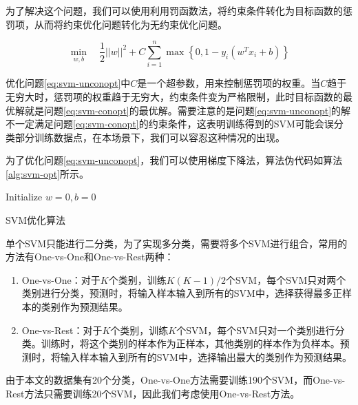 \documentclass{article}
\begin{document}
为了解决这个问题，我们可以使用利用罚函数法，将约束条件转化为目标函数的惩罚项，从而将约束优化问题转化为无约束优化问题。

\begin{equation}
\min_{w,b} \quad \frac{1}{2}||w||^2 + C\sum_{i=1}^n \max\left\{0, 1-y_i(w^Tx_i+b)\right\}
\label{eq:svm-unconopt}
\end{equation}

优化问题\ref{eq:svm-unconopt}中$C$是一个超参数，用来控制惩罚项的权重。当$C$趋于无穷大时，惩罚项的权重趋于无穷大，约束条件变为严格限制，此时目标函数的最优解就是问题\ref{eq:svm-conopt}的最优解。需要注意的是问题\ref{eq:svm-unconopt}的解不一定满足问题\ref{eq:svm-conopt}的约束条件，这表明训练得到的SVM可能会误分类部分训练数据点，在本场景下，我们可以容忍这种情况的出现。

为了优化问题\ref{eq:svm-unconopt}，我们可以使用梯度下降法，算法伪代码如算法\ref{alg:svm-opt}所示。

\begin{algorithm}[]
    \label{alg:svm-opt}
    \DontPrintSemicolon
    \SetAlgoLined
    Initialize $w=0,b=0$\;
    \caption{SVM优化算法}
\end{algorithm}

单个SVM只能进行二分类，为了实现多分类，需要将多个SVM进行组合，常用的方法有One-vs-One和One-vs-Rest两种：

\begin{enumerate}
    \item One-vs-One：对于$K$个类别，训练$K(K-1)/2$个SVM，每个SVM只对两个类别进行分类，预测时，将输入样本输入到所有的SVM中，选择获得最多正样本的类别作为预测结果。
    \item One-vs-Rest：对于$K$个类别，训练$K$个SVM，每个SVM只对一个类别进行分类。训练时，将这个类别的样本作为正样本，其他类别的样本作为负样本。预测时，将输入样本输入到所有的SVM中，选择输出最大的类别作为预测结果。
\end{enumerate}

由于本文的数据集有20个分类，One-vs-One方法需要训练190个SVM，而One-vs-Rest方法只需要训练20个SVM，因此我们考虑使用One-vs-Rest方法。
\end{document}
